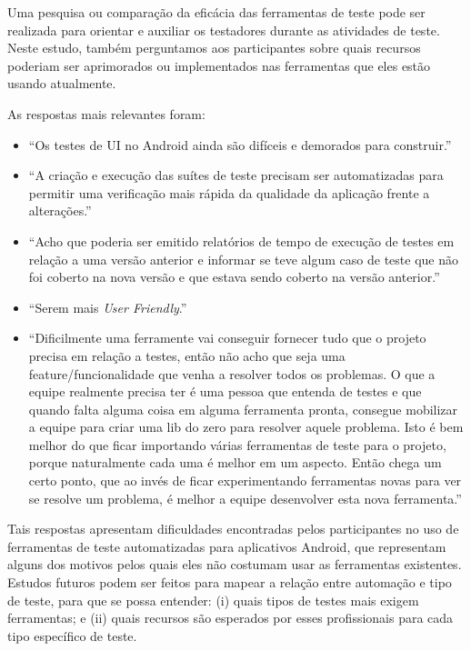 \begin{itemize}
Uma pesquisa ou comparação da eficácia das ferramentas de teste pode ser realizada para orientar e auxiliar os testadores durante as atividades de teste. Neste estudo, também perguntamos aos participantes sobre quais recursos poderiam ser aprimorados ou implementados nas ferramentas que eles estão usando atualmente.

As respostas mais relevantes foram:

\begin{itemize}
    \item ``Os testes de UI no Android ainda são difíceis e demorados para construir.''
    \item ``A criação e execução das suítes de teste precisam ser automatizadas para permitir uma verificação mais rápida da qualidade da aplicação frente a alterações.''
    \item ``Acho que poderia ser emitido relatórios de tempo de execução de testes em relação a uma versão anterior e informar se teve algum caso de teste que não foi coberto na nova versão e que estava sendo coberto na versão anterior.''
    \item ``Serem mais \textit{User Friendly}.''
    \item ``Dificilmente uma ferramente vai conseguir fornecer tudo que o projeto precisa em relação a testes, então não acho que seja uma feature/funcionalidade que venha a resolver todos os problemas. O que a equipe realmente precisa ter é uma pessoa que entenda de testes e que quando falta alguma coisa em alguma ferramenta pronta, consegue mobilizar a equipe para criar uma lib do zero para resolver aquele problema. Isto é bem melhor do que ficar importando várias ferramentas de teste para o projeto, porque naturalmente cada uma é melhor em um aspecto. Então chega um certo ponto, que ao invés de ficar experimentando ferramentas novas para ver se resolve um problema, é melhor a equipe desenvolver esta nova ferramenta.''
    
\end{itemize}

Tais respostas apresentam dificuldades encontradas pelos participantes no uso de ferramentas de teste automatizadas para aplicativos Android, que representam alguns dos motivos pelos quais eles não costumam usar as ferramentas existentes. Estudos futuros podem ser feitos para mapear a relação entre automação e tipo de teste, para que se possa entender: (i) quais tipos de testes mais exigem ferramentas; e (ii) quais recursos são esperados por esses profissionais para cada tipo específico de teste.
    

\end{itemize}
